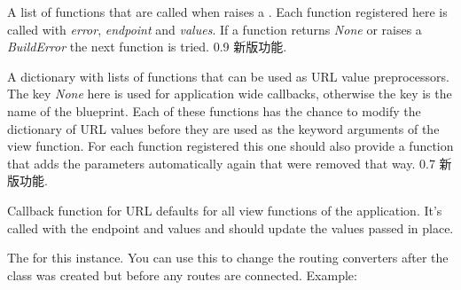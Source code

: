 \documentclass[a4paper,12pt]{sphinxmanual}
\begin{document}
\begin{fulllineitems}

\begin{fulllineitems}
\label{api:flask.Flask.url_build_error_handlers}
A list of functions that are called when {\hyperref[api:flask.url_for]{}} raises a
.  Each function registered here
is called with \emph{error}, \emph{endpoint} and \emph{values}.  If a function
returns \emph{None} or raises a \emph{BuildError} the next function is
tried.
0.9 新版功能.
\end{fulllineitems}


\begin{fulllineitems}
\label{api:flask.Flask.url_default_functions}
A dictionary with lists of functions that can be used as URL value
preprocessors.  The key \emph{None} here is used for application wide
callbacks, otherwise the key is the name of the blueprint.
Each of these functions has the chance to modify the dictionary
of URL values before they are used as the keyword arguments of the
view function.  For each function registered this one should also
provide a {\hyperref[api:flask.Flask.url_defaults]{}} function that adds the parameters
automatically again that were removed that way.
0.7 新版功能.
\end{fulllineitems}


\begin{fulllineitems}
\label{api:flask.Flask.url_defaults}
Callback function for URL defaults for all view functions of the
application.  It's called with the endpoint and values and should
update the values passed in place.

\end{fulllineitems}


\begin{fulllineitems}
\label{api:flask.Flask.url_map}
The \href{http://werkzeug.pocoo.org/docs/routing/\#werkzeug.routing.Map}{} for this instance.  You can use
this to change the routing converters after the class was created
but before any routes are connected.  Example:


\end{fulllineitems}
\end{fulllineitems}
\end{document}
